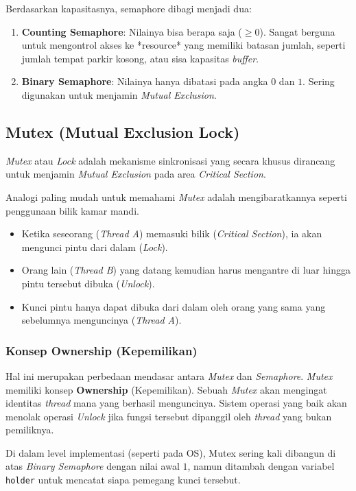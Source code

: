 Berdasarkan kapasitasnya, semaphore dibagi menjadi dua:
\begin{enumerate}
	\item \textbf{Counting Semaphore}: Nilainya bisa berapa saja ($\geq 0$). Sangat berguna untuk mengontrol akses ke *resource* yang memiliki batasan jumlah, seperti jumlah tempat parkir kosong, atau sisa kapasitas \textit{buffer}.
	\item \textbf{Binary Semaphore}: Nilainya hanya dibatasi pada angka $0$ dan $1$. Sering digunakan untuk menjamin \textit{Mutual Exclusion}.
\end{enumerate}

\subsection{Mutex (Mutual Exclusion Lock)}

\textit{Mutex} atau \textit{Lock} adalah mekanisme sinkronisasi yang secara khusus dirancang untuk menjamin \textit{Mutual Exclusion} pada area \textit{Critical Section}.

Analogi paling mudah untuk memahami \textit{Mutex} adalah mengibaratkannya seperti penggunaan bilik kamar mandi.
\begin{itemize}
	\item Ketika seseorang (\textit{Thread A}) memasuki bilik (\textit{Critical Section}), ia akan mengunci pintu dari dalam (\textit{Lock}).
	\item Orang lain (\textit{Thread B}) yang datang kemudian harus mengantre di luar hingga pintu tersebut dibuka (\textit{Unlock}).
	\item Kunci pintu hanya dapat dibuka dari dalam oleh orang yang sama yang sebelumnya menguncinya (\textit{Thread A}).
\end{itemize}

\subsubsection{Konsep Ownership (Kepemilikan)}
Hal ini merupakan perbedaan mendasar antara \textit{Mutex} dan \textit{Semaphore}. \textit{Mutex} memiliki konsep \textbf{Ownership} (Kepemilikan). Sebuah \textit{Mutex} akan mengingat identitas \textit{thread} mana yang berhasil menguncinya. Sistem operasi yang baik
akan menolak operasi \textit{Unlock} jika fungsi tersebut dipanggil oleh \textit{thread} yang bukan pemiliknya.

Di dalam level implementasi (seperti pada OS), Mutex sering kali dibangun di atas \textit{Binary Semaphore} dengan nilai awal $1$, namun ditambah dengan variabel \texttt{holder} untuk mencatat siapa pemegang kunci tersebut.

